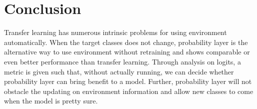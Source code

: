 \documentclass{article}
\begin{document}
\section{Conclusion}
Transfer learning has numerous intrinsic problems for using environment automatically. When the target classes does not change, probability layer is the alternative way to use environment without retraining and shows comparable or even better performance than transfer learning. Through analysis on logits, a metric is given such that, without actually running, we can decide whether probability layer can bring benefit to a model. Further, probability layer will not obstacle the updating on environment information and allow new classes to come when the model is pretty sure.





\end{document}
